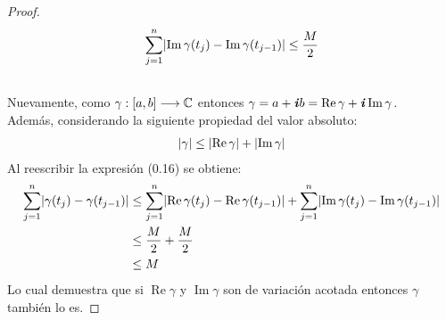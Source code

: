 \begin{enumerate}
\begin{proof}
\begin{align}
\sum_{j=1}^{n}  \lvert\operatorname{Im}\gamma(t_j) - \operatorname{Im}\gamma(t_{j-1})\rvert \leq \frac{M}{2}\\ \nonumber
\end{align}
Nuevamente, como $\gamma: [a,b] \longrightarrow \mathbb{C}$ entonces $\gamma=a+\textbf{\textit{i}}b=\operatorname{Re}\gamma + \textbf{\textit{i}}\operatorname{Im}\gamma$.\\
Además, considerando la siguiente propiedad del valor absoluto: 
\begin{align}
\lvert\gamma\rvert \leq \lvert\operatorname{Re}\gamma\rvert + \lvert\operatorname{Im}\gamma\rvert
\end{align}
Al reescribir la expresión (0.16) se obtiene:
\begin{align*}
\sum_{j=1}^{n} \lvert\gamma(t_j)-\gamma(t_{j-1})\rvert &\leq \sum_{j=1}^{n}\lvert\operatorname{Re}\gamma(t_j)-\operatorname{Re}\gamma(t_{j-1})\rvert + \sum_{j=1}^{n}\lvert\operatorname{Im}\gamma(t_j)-\operatorname{Im}\gamma(t_{j-1})\rvert \\
&\leq \frac{M}{2} + \frac{M}{2} \\
&\leq M \\
\end{align*}
Lo cual demuestra que si $\operatorname{Re} \gamma $ y $\operatorname{Im} \gamma $ son de variación acotada entonces $\gamma$ también lo es.
\end{proof}
\end{enumerate}



